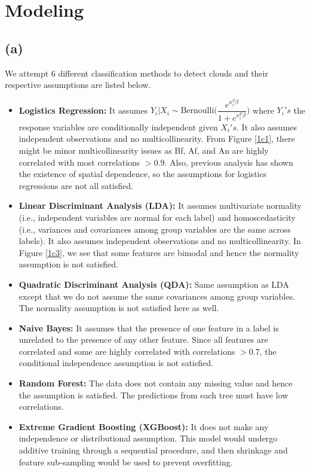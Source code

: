\documentclass[11pt]{article}
\theoremstyle{definition}
\begin{document}
\section{Modeling}
\subsection*{(a)}
We attempt 6 different classification methods to detect clouds and their respective assumptions are listed below. 
\begin{itemize}
\item \textbf{Logistics Regression:} It assumes \( Y_i|X_i \sim \text{Bernoulli}\Big(\dfrac{e^{x_i^T \beta}}{1+e^{x_i^T \beta}}\Big)\) where \(Y_i's\) the response variables are conditionally independent given \(X_i's\). It also assumes independent observations and no multicollinearity. From Figure \ref{1c1}, there might be minor multicollinearity issues as Bf, Af, and An are highly correlated with most correlations \( > 0.9\). Also, previous analysis has shown the existence of spatial dependence, so the assumptions for logistics regressions are not all satisfied.

\item \textbf{Linear Discriminant Analysis (LDA):} It assumes multivariate normality (i.e., independent variables are normal for each label) and homoscedasticity (i.e., variances and covariances among group variables are the same across labels). It also assumes independent observations and no multicollinearity. In Figure \ref{1c3}, we see that some features are bimodal and hence the normality assumption is not satisfied.

\item \textbf{Quadratic Discriminant Analysis (QDA):} Same assumption as LDA except that we do not assume the same covariances among group variables. The normality assumption is not satisfied here as well.

\item \textbf{Naive Bayes:} It assumes that the presence of one feature in a label is unrelated to the presence of any other feature. Since all features are correlated and some are highly correlated with correlations \( > 0.7\), the conditional independence assumption is not satisfied.

\item \textbf{Random Forest:} The data does not contain any missing value and hence the assumption is satisfied. The predictions from each tree must have low correlations.

\item \textbf{Extreme Gradient Boosting (XGBoost):} It does not make any independence or distributional assumption. This model would undergo additive training through a sequential procedure, and then shrinkage and feature sub-sampling would be used to prevent overfitting.
\end{itemize}
\end{document}
